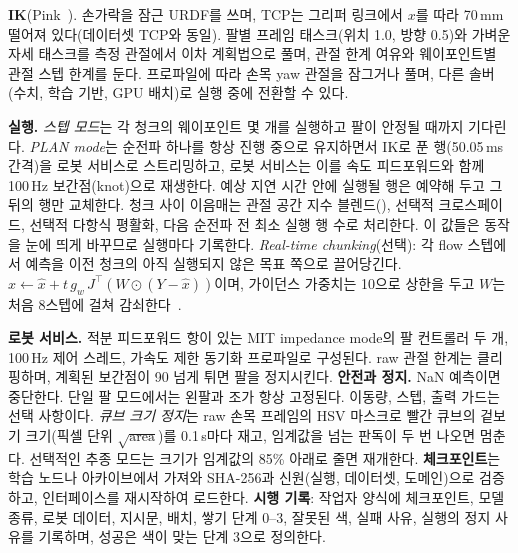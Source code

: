 \documentclass[conference,10pt]{IEEEtran}
\newcommand{\mm}{\,mm\xspace}
\begin{document}
\textbf{IK}(Pink~\cite{caron2024pink}). 손가락을 잠근 URDF를 쓰며, TCP는 그리퍼 링크에서 $x$를 따라 70\mm{} 떨어져 있다(데이터셋
TCP와 동일). 팔별 프레임 태스크(위치 1.0, 방향 0.5)와 가벼운 자세 태스크를 측정 관절에서 이차 계획법으로 풀며, 관절 한계 여유와
웨이포인트별 관절 스텝 한계를 둔다. 프로파일에 따라 손목 yaw 관절을 잠그거나 풀며, 다른 솔버(수치, 학습 기반, GPU 배치)로 실행 중에
전환할 수 있다.

\textbf{실행.} \emph{스텝 모드}는 각 청크의 웨이포인트 몇 개를 실행하고 팔이 안정될 때까지 기다린다. \emph{PLAN mode}는 순전파 하나를
항상 진행 중으로 유지하면서 IK로 푼 행(50.05\,ms 간격)을 로봇 서비스로 스트리밍하고, 로봇 서비스는 이를 속도 피드포워드와 함께
100\,Hz 보간점(knot)으로 재생한다. 예상 지연 시간 안에 실행될 행은 예약해 두고 그 뒤의 행만 교체한다. 청크 사이 이음매는 관절 공간 지수
블렌드(), 선택적 크로스페이드, 선택적 다항식 평활화, 다음 순전파 전 최소 실행 행 수로 처리한다. 이 값들은 동작을 눈에
띄게 바꾸므로 실행마다 기록한다. \emph{Real-time chunking}(선택): 각 flow 스텝에서 예측을 이전 청크의 아직 실행되지 않은 목표 쪽으로
끌어당긴다. $\hat x\leftarrow\hat x+t\,g_w\,J^\top(W\odot(Y-\hat x))$이며, 가이던스 가중치는 10으로 상한을 두고 $W$는 처음 8스텝에
걸쳐 감쇠한다~\cite{black2025rtc}.

\textbf{로봇 서비스.} 적분 피드포워드 항이 있는 MIT impedance mode의 팔 컨트롤러 두 개, 100\,Hz 제어 스레드, 가속도 제한 동기화
프로파일로 구성된다. raw 관절 한계는 클리핑하며, 계획된 보간점이 90\textdegree{} 넘게 튀면 팔을 정지시킨다. \textbf{안전과 정지.} NaN
예측이면 중단한다. 단일 팔 모드에서는 왼팔과 조가 항상 고정된다. 이동량, 스텝, 출력 가드는 선택 사항이다. \emph{큐브 크기 정지}는
raw 손목 프레임의 HSV 마스크로 빨간 큐브의 겉보기 크기(픽셀 단위 $\sqrt{\text{area}}$)를 0.1\,s마다 재고, 임계값을 넘는 판독이 두 번
나오면 멈춘다. 선택적인 추종 모드는 크기가 임계값의 85\% 아래로 줄면 재개한다. \textbf{체크포인트}는 학습 노드나 아카이브에서
가져와 SHA-256과 신원(실행, 데이터셋, 도메인)으로 검증하고, 인터페이스를 재시작하여 로드한다. \textbf{시행 기록}: 작업자 양식에
체크포인트, 모델 종류, 로봇 데이터, 지시문, 배치, 쌓기 단계 0--3, 잘못된 색, 실패 사유, 실행의 정지 사유를 기록하며, 성공은 색이
맞는 단계 3으로 정의한다.
\end{document}
